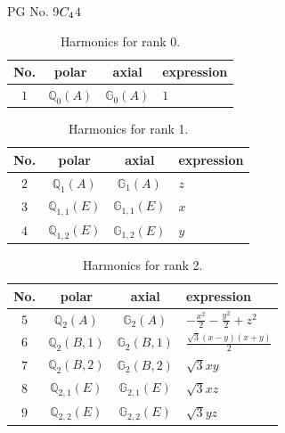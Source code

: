 \documentclass[fleqn,8pt,landscape]{jsarticle}
\begin{document}
\setcounter{MaxMatrixCols}{32}

\renewcommand{\tablename}{Table~}
\renewcommand{\figurename}{Figure~}
\begin{center}
\LARGE
PG No. 9\quad$C_{\rm 4}$\quad$4$\quad[ tetragonal ]
\end{center}
\begin{table}[ht!]
\begin{center}
\caption{Harmonics for rank 0.}
\renewcommand{\arraystretch}{1.3}
\begin{tabular}{cccl} \hline \hline
No. & polar & axial & expression \\ \hline
$ 1 $ & $ \mathbb{Q}_{0}(A) $ & $ \mathbb{G}_{0}(A) $ & $ 1 $ \\
 \hline \hline
\end{tabular}
\end{center}
\end{table}
\begin{table}[ht!]
\begin{center}
\caption{Harmonics for rank 1.}
\renewcommand{\arraystretch}{1.3}
\begin{tabular}{cccl} \hline \hline
No. & polar & axial & expression \\ \hline
$ 2 $ & $ \mathbb{Q}_{1}(A) $ & $ \mathbb{G}_{1}(A) $ & $ z $ \\
$ 3 $ & $ \mathbb{Q}_{1,1}(E) $ & $ \mathbb{G}_{1,1}(E) $ & $ x $ \\
$ 4 $ & $ \mathbb{Q}_{1,2}(E) $ & $ \mathbb{G}_{1,2}(E) $ & $ y $ \\
 \hline \hline
\end{tabular}
\end{center}
\end{table}
\begin{table}[ht!]
\begin{center}
\caption{Harmonics for rank 2.}
\renewcommand{\arraystretch}{1.3}
\begin{tabular}{cccl} \hline \hline
No. & polar & axial & expression \\ \hline
$ 5 $ & $ \mathbb{Q}_{2}(A) $ & $ \mathbb{G}_{2}(A) $ & $ - \frac{x^{2}}{2} - \frac{y^{2}}{2} + z^{2} $ \\
$ 6 $ & $ \mathbb{Q}_{2}(B,1) $ & $ \mathbb{G}_{2}(B,1) $ & $ \frac{\sqrt{3} \left(x - y\right) \left(x + y\right)}{2} $ \\
$ 7 $ & $ \mathbb{Q}_{2}(B,2) $ & $ \mathbb{G}_{2}(B,2) $ & $ \sqrt{3} x y $ \\
$ 8 $ & $ \mathbb{Q}_{2,1}(E) $ & $ \mathbb{G}_{2,1}(E) $ & $ \sqrt{3} x z $ \\
$ 9 $ & $ \mathbb{Q}_{2,2}(E) $ & $ \mathbb{G}_{2,2}(E) $ & $ \sqrt{3} y z $ \\
 \hline \hline
\end{tabular}
\end{center}
\end{table}
\end{document}

